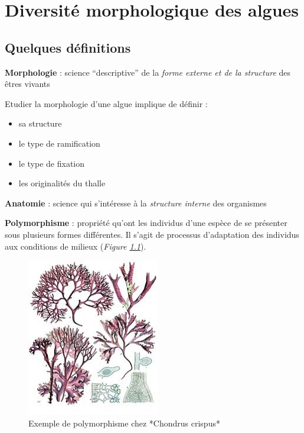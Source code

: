 \documentclass[
]{book}
\providecommand{\tightlist}{%
  \setlength{\itemsep}{0pt}\setlength{\parskip}{0pt}}
\begin{document}
\hypertarget{morphologie}{%
\chapter{Diversité morphologique des algues}\label{morphologie}}

\hypertarget{quelques-duxe9finitions}{%
\section*{Quelques définitions}\label{quelques-duxe9finitions}}

\textbf{Morphologie} : science ``descriptive'' de la \emph{forme externe et de la structure} des êtres vivants

Etudier la morphologie d'une algue implique de définir :

\begin{itemize}
\tightlist
\item
  sa structure
\item
  le type de ramification
\item
  le type de fixation
\item
  les originalités du thalle
\end{itemize}

\textbf{Anatomie} : science qui s'intéresse à la \emph{structure interne} des organismes

\textbf{Polymorphisme} : propriété qu'ont les individus d'une espèce de se présenter sous plusieurs formes différentes. Il s'agit de processus d'adaptation des individus aux conditions de milieux (\emph{Figure \ref{fig:polym-condrus}}).

\begin{figure}[H]

{\centering \includegraphics[width=0.7\linewidth]{./images/polymorph_chondrus} 

}

\caption{Exemple de polymorphisme chez *Chondrus crispus*}\label{fig:polym-condrus}
\end{figure}
\end{document}
